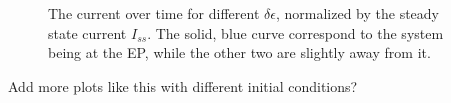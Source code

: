 \documentclass[../main.tex]{subfiles}
\begin{document}
\begin{figure}[H]
\begin{subfigure}[t]{.5\textwidth}
  \caption{}
  \label{fig:diffde2}
\end{subfigure}
\caption{The current over time for different $\delta\epsilon$, normalized by the steady state current $I_{ss}$. The solid, blue curve correspond to the system being at the EP, while the other two are slightly away from it.}
\label{fig:diffI}
\end{figure}


Add more plots like this with different initial conditions?
\end{document}
